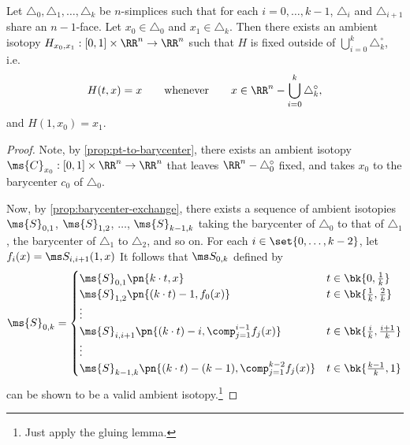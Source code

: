 \begin{corollary}\label{cor:moving-through-simplices}
  Let $\triangle_0, \triangle_1, \ldots, \triangle_k$ be
  $n$-simplices such that for each $i = 0, \ldots, k-1$,
  $\triangle_{i}$ and $\triangle_{i+1}$ share an $n-1$-face. Let
  $x_0 \in \triangle_0$ and $x_1 \in \triangle_k$. Then there
  exists an ambient isotopy $H_{x_0, x_1} : [0,1] \times \RR^n \to
  \RR^n$ such that $H$ is fixed outside of $\bigcup_{i=0}^k
  \triangle_k^\circ$, i.e.
  \[
    H(t, x) = x \qquad\text{\rm whenever}\qquad x \in \RR^n -
    \bigcup_{i=0}^k \triangle_k^\circ,
  \]
  and $H(1, x_0) = x_1$.
\end{corollary}
\begin{proof}\renewcommand{\qed}{\hfill$\square$}
  Note, by \cref{prop:pt-to-barycenter}, there exists an ambient
  isotopy $\ms{C}_{x_0} : [0,1] \times \RR^n \to \RR^n$ that
  leaves $\RR^n - \triangle_0^\circ$ fixed, and takes $x_0$ to the
  barycenter $c_0$ of $\triangle_0$.

  Now, by \cref{prop:barycenter-exchange}, there exists a sequence
  of ambient isotopies $\ms{S}_{0,1}$, $\ms{S}_{1,2}$, $\ldots$,
  $\ms{S}_{k-1,k}$ taking the barycenter of $\triangle_0$ to that of
  $\triangle_1$, the barycenter of $\triangle_1$ to $\triangle_2$,
  and so on. For each $i \in \set{0, \ldots, k-2}$, let $f_i(x) =
  \ms S_{i,i+1}(1, x)$ It follows that $\ms S_{0,k}$ defined by
  \[
    \ms{S}_{0,k} =
    \begin{cases}
      \ms{S}_{0,1}\pn{k \cdot t, x} & t \in \bk{0, \frac{1}{k}} \\
      \ms{S}_{1,2}\pn{(k \cdot t) - 1, f_0(x)} & t \in
      \bk{\frac{1}{k}, \frac{2}{k}} \\
      \vdots & \\
      \ms{S}_{i,i+1}\pn{(k \cdot t) - i, \comp_{j=1}^{i-1} f_j(x)} &
      t \in \bk{\frac{i}{k}, \frac{i+1}{k}} \\
      \vdots & \\
      \ms{S}_{k-1,k}\pn{(k \cdot t) - (k-1), \comp_{j=1}^{k-2}
        f_j(x)} & t \in
      \bk{\frac{k-1}{k}, 1} \\
    \end{cases}
  \]
  can be shown to be a valid ambient isotopy.\footnote{Just apply
    the gluing lemma.}
\end{proof}

